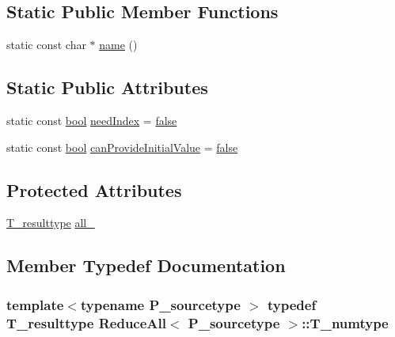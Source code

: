 \subsection*{Static Public Member Functions}
\begin{DoxyCompactItemize}
\item 
static const char $\ast$ \hyperlink{classReduceAll_a6d9e9d7a5f1e72034ecb556d23213653}{name} ()
\end{DoxyCompactItemize}
\subsection*{Static Public Attributes}
\begin{DoxyCompactItemize}
\item 
static const \hyperlink{compiler_8h_abb452686968e48b67397da5f97445f5b}{bool} \hyperlink{classReduceAll_ae4994bdeee71db701d286424d0c2f501}{need\+Index} = \hyperlink{compiler_8h_a65e9886d74aaee76545e83dd09011727}{false}
\item 
static const \hyperlink{compiler_8h_abb452686968e48b67397da5f97445f5b}{bool} \hyperlink{classReduceAll_ae5f5ceb1b8070d3f573c8a06aade09a9}{can\+Provide\+Initial\+Value} = \hyperlink{compiler_8h_a65e9886d74aaee76545e83dd09011727}{false}
\end{DoxyCompactItemize}
\subsection*{Protected Attributes}
\begin{DoxyCompactItemize}
\item 
\hyperlink{classReduceAll_a002a37d5068dee35a2e7aa99f51534c8}{T\+\_\+resulttype} \hyperlink{classReduceAll_a8f66a3b45ced05f78e3ce051c663b081}{all\+\_\+}
\end{DoxyCompactItemize}


\subsection{Member Typedef Documentation}
\hypertarget{classReduceAll_a9ffb6c80449a64513a350fde7be01e25}{}
\subsubsection[{T\+\_\+numtype}]{\setlength{\rightskip}{0pt plus 5cm}template$<$typename P\+\_\+sourcetype $>$ typedef {\bf T\+\_\+resulttype} {\bf Reduce\+All}$<$ P\+\_\+sourcetype $>$\+::{\bf T\+\_\+numtype}}\label{classReduceAll_a9ffb6c80449a64513a350fde7be01e25}
\hypertarget{classReduceAll_a002a37d5068dee35a2e7aa99f51534c8}{}
